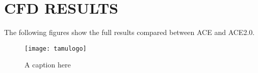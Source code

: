 %
%	 
%


\chapter{CFD RESULTS}
\label{appendix:cfd}

The following figures show the full results compared between ACE and ACE2.0.

\begin{figure}[ht]
    \centering
    \texttt{[image: tamulogo]}
    \caption{A caption here}
\end{figure}


